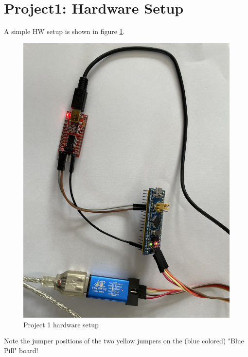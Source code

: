 \documentclass[11pt, oneside]{scrartcl}   	%
\begin{document}
\section{Project1: Hardware Setup}
A simple HW setup is shown in figure \ref{fig:HWSetup}.
\begin{figure}[htbp]
	\centering
	\includegraphics[width=1.0\linewidth]{Figures/HardwareSetup_BluePill+STLinkV2+USBSerialAdapter.jpeg}
	\caption{Project 1 hardware setup}
	\label{fig:HWSetup}
\end{figure}

Note the jumper positions of the two yellow jumpers on the (blue colored) "Blue Pill" board!\\
\end{document}

